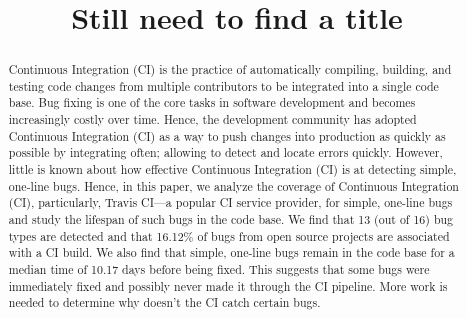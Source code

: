 \documentclass[10pt,conference]{IEEEtran}
\begin{document}
\title{Still need to find a title}


\author{
\and
{}
\and
{}
}

\maketitle

\begin{abstract}
Continuous Integration (CI) is the practice of automatically compiling, building, and testing code changes from multiple contributors to be integrated into a single code base. Bug fixing is one of the core tasks in software development and becomes increasingly costly over time. Hence, the development community has adopted Continuous Integration (CI) as a way to push changes into production as quickly as possible by integrating often; allowing to detect and locate errors quickly. However, little is known about how effective Continuous Integration (CI) is at detecting simple, one-line bugs. Hence, in this paper, we analyze the coverage of Continuous Integration (CI), particularly, Travis CI---a popular CI service provider, for simple, one-line bugs and study the lifespan of such bugs in the code base. We find that 13 (out of 16) bug types are detected and that 16.12\% of bugs from open source projects are associated with a CI build. We also find that simple, one-line bugs remain in the code base for a median time of 10.17 days before being fixed. This suggests that some bugs were immediately fixed and possibly never made it through the CI pipeline. More work is needed to determine why doesn't the CI catch certain bugs. 
\end{abstract}
\end{document}
